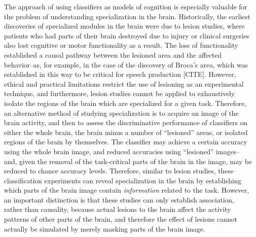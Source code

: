 The approach of using classifiers as models of cognition is especially
valuable for the problem of understanding specialization in the brain.
Historically, the earliest discoveries of specialized modules in the
brain were due to lesion studies, where patients who had parts of
their brain destroyed due to injury or clinical surgeries also lost
cognitive or motor functionality as a result.  The loss of
functionality established a causal pathway between the lesioned area
and the affected behavior--as, for example, in the case of the
discovery of Broca's area, which was established in this way to be
critical for speech production [CITE].  However, ethical and practical
limitations restrict the use of lesioning as an experimental
technique, and furthermore, lesion studies cannot be applied to
exhaustively isolate the regions of the brain which are specialized
for a given task.  
Therefore, an alternative method of studying specialization is to
acquire an image of the brain activity, and then to assess the
discriminative performance of classifiers on either the whole brain,
the brain minus a number of ``lesioned'' areas, or isolated regions of
the brain by themselves.  The classifier may achieve a certain
accuracy using the whole brain image, and reduced accuracies using
``lesioned'' images--and, given the removal of the task-critical parts
of the brain in the image, may be reduced to chance accuracy levels.
Therefore, similar to lesion studies, these classification experiments
can reveal specialization in the brain by establishing which parts of
the brain image contain \emph{information} related to the task.  However, an
important distinction is that these studies can only establish
association, rather than causality, because actual lesions to the
brain affect the activity patterns of other parts of the brain, and
therefore the effect of lesions cannot actually be simulated by merely
masking parts of the brain image.

